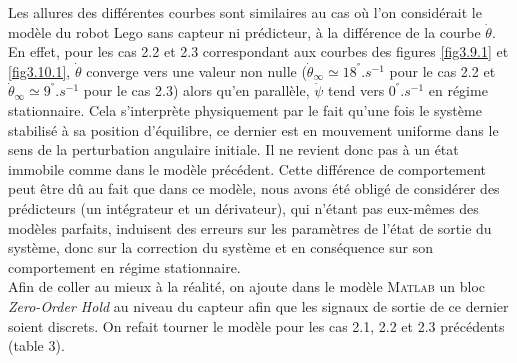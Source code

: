 \documentclass[a4paper]{article}
\begin{document}
                        Les allures des différentes courbes sont similaires au cas où l'on considérait le modèle du robot Lego sans capteur ni prédicteur,
                        à la différence de la courbe $\dot \theta$.
                        En effet, pour les cas 2.2 et 2.3 correspondant aux courbes des figures \ref{fig3.9.1} et \ref{fig3.10.1},
                        $\dot \theta$ converge vers une valeur non nulle ($\dot \theta_{\infty} \simeq 18^{°}.s^{-1}$ pour le cas 2.2 et 
                        $\dot \theta_{\infty} \simeq 9^{°}.s^{-1}$ pour le cas 2.3) alors qu'en parallèle, $\dot \psi$ tend vers $0^{°}.s^{-1}$ en régime stationnaire.
                        Cela s'interprète physiquement par le fait qu'une fois le système stabilisé à sa position d'équilibre, ce dernier est en mouvement uniforme
                        dans le sens de la perturbation angulaire initiale.
                        Il ne revient donc pas à un état immobile comme dans le modèle précédent.
                        Cette différence de comportement peut être dû au fait que dans ce modèle, nous avons été obligé de considérer des prédicteurs 
                        (un intégrateur et un dérivateur), qui n'étant pas eux-mêmes des modèles parfaits, induisent des erreurs sur les paramètres de l'état
                        de sortie du système, donc sur la correction du système et en conséquence sur son comportement en régime stationnaire.\\

                        Afin de coller au mieux à la réalité, on ajoute dans le modèle \textsc{Matlab} un bloc \textit{Zero-Order Hold}
                        au niveau du capteur afin que les signaux de sortie de ce dernier soient discrets.
                        On refait tourner le modèle pour les cas 2.1, 2.2 et 2.3 précédents (table 3).
                        
\end{document}
